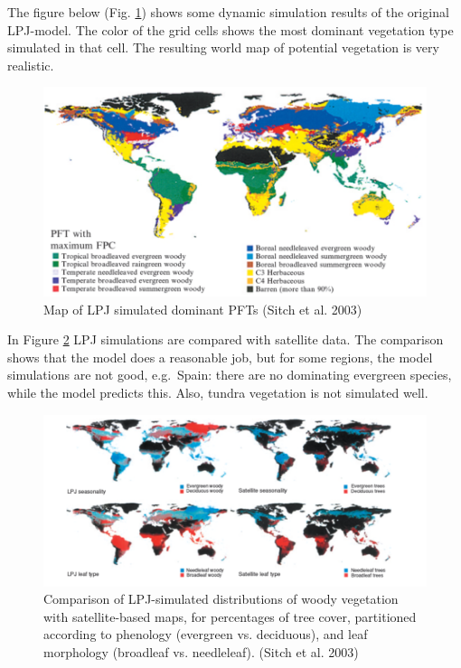 \documentclass[12pt,oneside]{book}
\begin{document}
The figure below (Fig. \ref{fig:f65}) shows some dynamic simulation
results of the original LPJ-model. The color of the grid cells shows the
most dominant vegetation type simulated in that cell. The resulting
world map of potential vegetation is very realistic.

\begin{figure}

{\centering \includegraphics[width=0.8\linewidth]{figures/chap6/f65_LPJ_PFTmap} 

}

\caption{Map of LPJ simulated dominant PFTs (Sitch et al. 2003)}\label{fig:f65}
\end{figure}

In Figure \ref{fig:f66} LPJ simulations are compared with satellite
data. The comparison shows that the model does a reasonable job, but for
some regions, the model simulations are not good, e.g.~Spain: there are
no dominating evergreen species, while the model predicts this. Also,
tundra vegetation is not simulated well.

\begin{figure}

{\centering \includegraphics[width=0.8\linewidth]{figures/chap6/f66_LPJ_comparison_sitch} 

}

\caption{Comparison of LPJ-simulated distributions of woody vegetation with satellite-based maps, for percentages of tree cover, partitioned according to phenology (evergreen vs. deciduous), and leaf morphology (broadleaf vs. needleleaf). (Sitch et al. 2003)}\label{fig:f66}
\end{figure}
\end{document}
